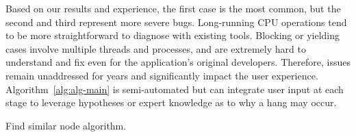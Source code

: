 Based on our results and experience, the first case is the most common, but
the second and third represent more severe bugs. Long-running CPU operations
tend to be more straightforward to diagnose with existing tools. Blocking
or yielding cases involve multiple threads and processes, and are extremely
hard to understand and fix even for the application's original developers.
Therefore, issues remain unaddressed for years and significantly impact the user
experience. Algorithm~\ref{alg:alg-main} is semi-automated but can integrate
user input at each stage to leverage hypotheses or expert knowledge as to why a
hang may occur.

\begin{algorithm}[ht!]
    \caption{\xxx Find similar node algorithm.}
    \label{alg:alg-findsimilarnode}
\begin{algorithmic}[1]
\Statex
{}
		\EndIf
	\EndFor
		\EndIf
	\EndIf
\EndFor
\EndFunction
\end{algorithmic}
\end{algorithm}

